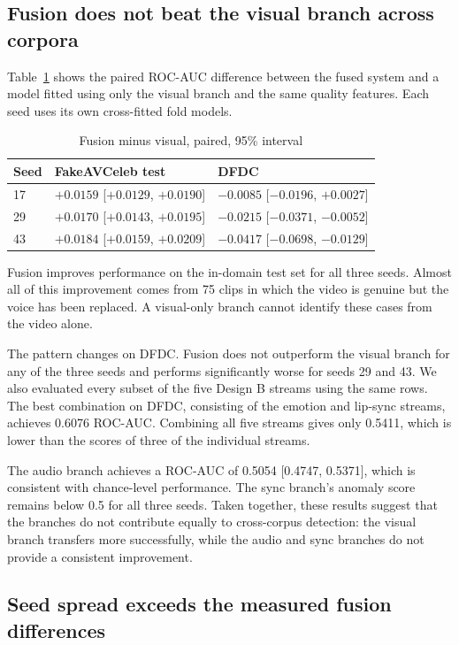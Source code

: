 \documentclass[conference]{IEEEtran}
\begin{document}
\subsection{Fusion does not beat the visual branch across corpora}

Table~\ref{tab:fusion} shows the paired ROC-AUC difference between the fused
system and a model fitted using only the visual branch and the same quality
features. Each seed uses its own cross-fitted fold models.

\begin{table}[htbp]
\caption{Fusion minus visual, paired, 95\% interval}
\label{tab:fusion}
\centering
\begin{tabular}{lll}
\toprule
Seed & FakeAVCeleb test & DFDC \\
\midrule
17 & $+0.0159$ [$+0.0129$, $+0.0190$] & $-0.0085$ [$-0.0196$, $+0.0027$] \\
29 & $+0.0170$ [$+0.0143$, $+0.0195$] & $-0.0215$ [$-0.0371$, $-0.0052$] \\
43 & $+0.0184$ [$+0.0159$, $+0.0209$] & $-0.0417$ [$-0.0698$, $-0.0129$] \\
\bottomrule
\end{tabular}
\end{table}

Fusion improves performance on the in-domain test set for all three seeds.
Almost all of this improvement comes from 75 clips in which the video is
genuine but the voice has been replaced. A visual-only branch cannot identify
these cases from the video alone.

The pattern changes on DFDC. Fusion does not outperform the visual branch
for any of the three seeds and performs significantly worse for seeds 29
and 43. We also evaluated every subset of the five Design B streams using
the same rows. The best combination on DFDC, consisting of the emotion and
lip-sync streams, achieves 0.6076 ROC-AUC. Combining all five streams gives
only 0.5411, which is lower than the scores of three of the individual
streams.

The audio branch achieves a ROC-AUC of 0.5054 [0.4747, 0.5371], which is
consistent with chance-level performance. The sync branch's anomaly score
remains below 0.5 for all three seeds. Taken together, these results suggest
that the branches do not contribute equally to cross-corpus detection: the
visual branch transfers more successfully, while the audio and sync branches
do not provide a consistent improvement.

\subsection{Seed spread exceeds the measured fusion differences}
\end{document}
